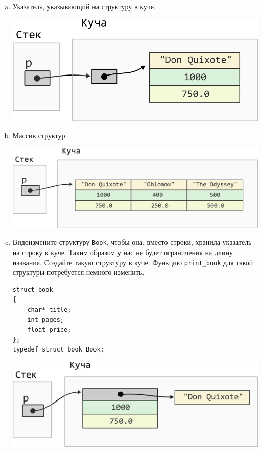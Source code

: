 \documentclass[10pt]{article}
\newcommand{\mallocImagesScale}{0.72}
\begin{document}
\begin{enumerate}[a.]
\item Указатель, указывающий на структуру в куче.
\begin{center}
\includegraphics[scale=\mallocImagesScale]{../images/malloc_homework/05heap_pointer_struct_book.png}
\end{center}


\item Массив структур.
\begin{center}
\includegraphics[scale=\mallocImagesScale]{../images/malloc_homework/06heap_struct_book_array.png}
\end{center}

\item Видоизмените структуру \texttt{Book}, чтобы она, вместо строки, хранила указатель на строку в куче. Таким образом у нас не будет ограничения на длину названия. Создайте такую структуру в куче. Функцию \texttt{print\_book} для такой структуры потребуется немного изменить.
\begin{lstlisting}
struct book 
{
    char* title;
    int pages;
    float price;
};
typedef struct book Book;
\end{lstlisting}

\begin{center}
\includegraphics[scale=\mallocImagesScale]{../images/malloc_homework/07heap_struct_book_title_heap.png}
\end{center}


\end{enumerate}
\end{document}
